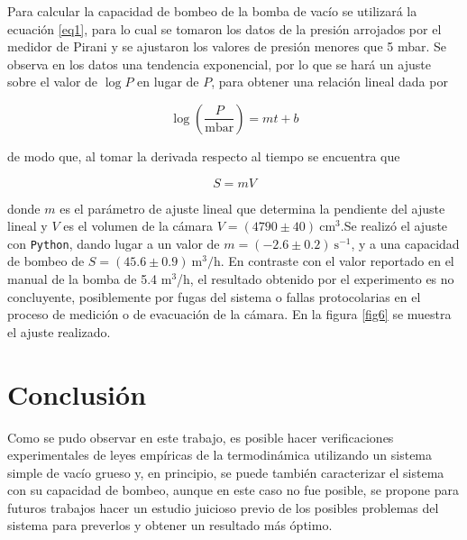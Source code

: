 \documentclass[final,5p,times,twocolumn, nopreprintline]{elsarticle}
\numberwithin{equation}{section}
\begin{document}
Para calcular la capacidad de bombeo de la bomba de vacío se utilizará la ecuación \ref{eq1}, para lo cual se tomaron los datos de la presión arrojados por el medidor de Pirani y se ajustaron los valores de presión menores que 5 mbar. Se observa en los datos una tendencia exponencial, por lo que se hará un ajuste sobre el valor de $\log P$ en lugar de $P$, para obtener una relación lineal dada por

\begin{equation}
\log \left(\dfrac{P}{\text{mbar}}\right) = mt+b \label{eq3}
\end{equation}

de modo que, al tomar la derivada respecto al tiempo se encuentra que 

\begin{equation}
S = mV \label{eq4}
\end{equation}

donde $m$ es el parámetro de ajuste lineal que determina la pendiente del ajuste lineal y $V$ es el volumen de la cámara $V=(4790\pm40)~\text{cm}^3$.Se realizó el ajuste con \texttt{Python}, dando lugar a un valor de $m=(-2.6\pm0.2)~\text{s}^{-1}$, y a una capacidad de bombeo de $S=(45.6\pm0.9)~\text{m}^3/\text{h}$. En contraste con el valor reportado en el manual de la bomba \cite{pfeiffer2005sd} de 5.4 m$^3$/h, el resultado obtenido por el experimento es no concluyente, posiblemente por fugas del sistema o fallas protocolarias en el proceso de medición o de evacuación de la cámara. En la figura \ref{fig6} se muestra el ajuste realizado.


\section{Conclusión}

Como se pudo observar en este trabajo, es posible hacer verificaciones experimentales de leyes empíricas de la termodinámica utilizando un sistema simple de vacío grueso y, en principio, se puede también caracterizar el sistema con su capacidad de bombeo, aunque en este caso no fue posible, se propone para futuros trabajos hacer un estudio juicioso previo de los posibles problemas del sistema para preverlos y obtener un resultado más óptimo.
\end{document}
